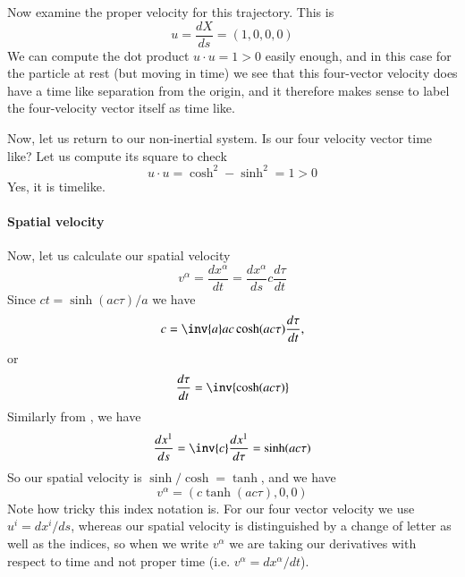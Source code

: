 {Now examine the proper velocity for this trajectory.  This is
%
\begin{equation}\label{eqn:relativisticElectrodynamicsT2:72}
u = \frac{dX}{ds} = (1, 0, 0, 0)
\end{equation}
%
We can compute the dot product \(u \cdot u = 1 > 0\) easily enough, and in this case for the particle at rest (but moving in time) we see that this four-vector velocity does have a time like separation from the origin, and it therefore makes sense to label the four-velocity vector itself as time like.

Now, let us return to our non-inertial system.  Is our four velocity vector time like?  Let us compute its square to check
%
\begin{equation}\label{eqn:relativisticElectrodynamicsT2:90}
u \cdot u = \cosh^2 - \sinh^2 = 1 > 0
\end{equation}
%
Yes, it is timelike.
%
\paragraph{Spatial velocity}

Now, let us calculate our spatial velocity
%
\begin{equation}\label{eqn:relativisticElectrodynamicsT2:100}
v^\alpha
= \frac{dx^\alpha}{dt}
=
\frac{dx^\alpha}{ds} c \frac{d\tau}{dt}
\end{equation}
%
Since \(ct = \sinh( a c \tau )/a\) we have
%
\begin{equation}\label{eqn:relativisticElectrodynamicsT2:110}
c = \inv{a} a c \cosh( a c \tau ) \frac{d\tau}{dt},
\end{equation}
or
\begin{equation}\label{eqn:relativisticElectrodynamicsT2:110b}
\frac{d\tau}{dt} = \inv{\cosh( a c \tau) }
\end{equation}
%
Similarly from , we have
%
\begin{equation}\label{eqn:relativisticElectrodynamicsT2:120}
\frac{dx^1}{ds} = \inv{c} \frac{dx^1}{d\tau} = \sinh( a c \tau )
\end{equation}
%
So our spatial velocity is \(\sinh/\cosh = \tanh\), and we have
%
\begin{equation}\label{eqn:relativisticElectrodynamicsT2:130}
v^\alpha = (c \tanh( a c \tau), 0, 0)
\end{equation}
%
Note how tricky this index notation is.  For our four vector velocity we use \(u^i = dx^i/ds\), whereas our spatial velocity is distinguished by a change of letter as well as the indices, so when we write \(v^\alpha\) we are taking our derivatives with respect to time and not proper time (i.e. \(v^\alpha = dx^\alpha/dt\)).

}
